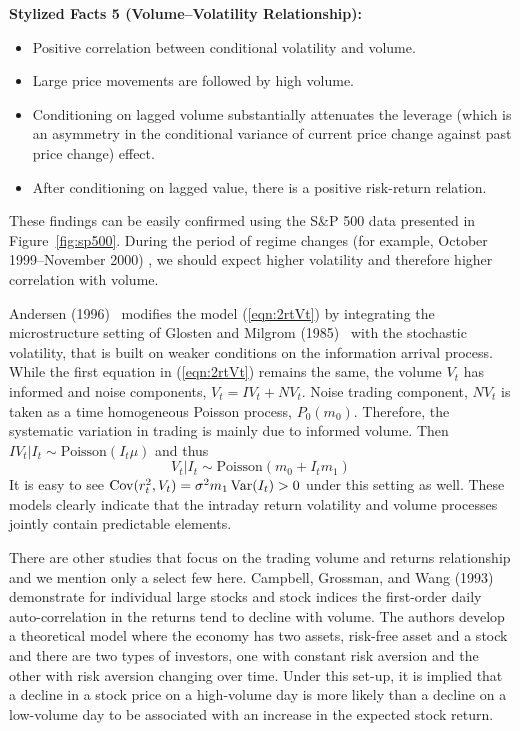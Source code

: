\noindent\textbf{Stylized Facts 5 (Volume--Volatility Relationship):} 

\begin{itemize}
\item  Positive correlation between conditional volatility and volume.

\item Large price movements are followed by high volume.

\item Conditioning on lagged volume substantially attenuates the leverage (which is an asymmetry in the conditional variance of current price change against past price change) effect.

\item After conditioning on lagged value, there is a positive risk-return relation.
\end{itemize}

These findings can be easily confirmed using the S\&P 500 data presented in Figure~\ref{fig:sp500}. During the period of regime changes (for example, October 1999--November 2000) , we should expect higher volatility and therefore higher correlation with volume. 


Andersen (1996)~\cite{andersen} modifies the model (\ref{eqn:2rtVt}) by integrating the microstructure
setting of Glosten and Milgrom (1985)~\cite{glostenmilgrom} with the stochastic volatility, that is built on weaker conditions on the information arrival process. While the first equation in (\ref{eqn:2rtVt}) remains the same, the volume $V_t$ has informed and noise components, $V_t = IV_t + NV_t$. Noise trading component, $NV_t$ is taken as a time homogeneous Poisson process, $P_0(m_0)$. Therefore, the systematic variation in trading is mainly due to informed volume. Then $IV_t|I_t \sim \text{Poisson}(I_t\mu)$ and thus
	\begin{equation}\label{eqn:2VtIt}
	V_t|I_t \sim \text{Poisson}(m_0 + I_t m_1)
	\end{equation}
It is easy to see $\operatorname{Cov}(r_t^2,V_t) = \sigma^2m_1 \operatorname{Var}(I_t) > 0$ under this setting as well. These models clearly indicate that the intraday return volatility and volume processes jointly contain predictable elements.


There are other studies that focus on the trading volume and returns relationship and we mention only a select few here. Campbell, Grossman, and Wang (1993)~\cite{campbellgross} demonstrate for individual large stocks and stock indices the first-order daily auto-correlation in the returns tend to decline with volume. The authors develop a theoretical model where the economy has two assets, risk-free asset and a stock and there are two types of investors, one with constant risk aversion and the other with risk aversion changing over time. Under this set-up, it is implied that a decline in a stock price on a high-volume day is more likely than a decline on a low-volume day to be associated with an increase in the expected stock return.


